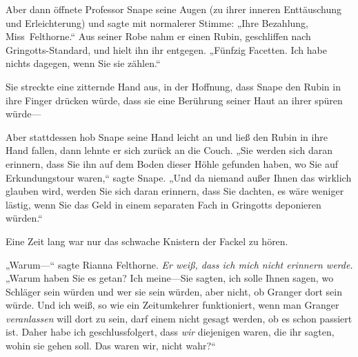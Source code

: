 Aber dann öffnete Professor Snape seine Augen (zu ihrer inneren Enttäuschung und Erleichterung) und sagte mit normalerer Stimme: „Ihre Bezahlung, Miss~Felthorne.“ Aus seiner Robe nahm er einen Rubin, geschliffen nach Gringotts-Standard, und hielt ihn ihr entgegen. „Fünfzig Facetten. Ich habe nichts dagegen, wenn Sie sie zählen.“

Sie streckte eine zitternde Hand aus, in der Hoffnung, dass Snape den Rubin in ihre Finger drücken würde, dass sie eine Berührung seiner Haut an ihrer spüren würde—

Aber stattdessen hob Snape seine Hand leicht an und ließ den Rubin in ihre Hand fallen, dann lehnte er sich zurück an die Couch. „Sie werden sich daran erinnern, dass Sie ihn auf dem Boden dieser Höhle gefunden haben, wo Sie auf Erkundungstour waren,“ sagte Snape. „Und da niemand außer Ihnen das wirklich glauben wird, werden Sie sich daran erinnern, dass Sie dachten, es wäre weniger lästig, wenn Sie das Geld in einem separaten Fach in Gringotts deponieren würden.“

Eine Zeit lang war nur das schwache Knistern der Fackel zu hören.

„Warum—“ sagte Rianna Felthorne. \emph{Er weiß, dass ich mich nicht erinnern werde.} „Warum haben Sie es getan? Ich meine—Sie sagten, ich solle Ihnen sagen, wo Schläger sein würden und wer sie sein würden, aber nicht, ob Granger dort sein würde. Und ich weiß, so wie ein Zeitumkehrer funktioniert, wenn man Granger \emph{veranlassen} will dort zu sein, darf einem nicht gesagt werden, ob es schon passiert ist. Daher habe ich geschlussfolgert, dass \emph{wir} diejenigen waren, die ihr sagten, wohin sie gehen soll. Das waren wir, nicht wahr?“

